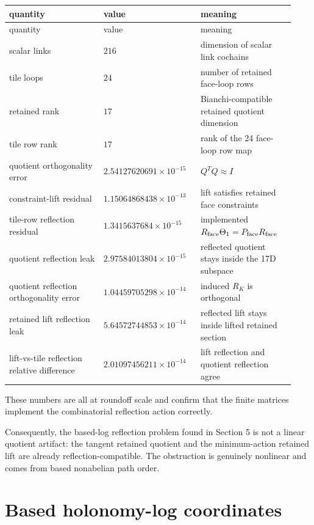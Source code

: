 \documentclass[10pt]{article}
\begin{document}
\begin{center}
\small
\begin{longtable}{|p{0.31\linewidth}|p{0.31\linewidth}|p{0.31\linewidth}|}
\hline
quantity & value & meaning \\
\hline
\endfirsthead
\hline
quantity & value & meaning \\
\hline
\endhead
scalar links & \(216\) & dimension of scalar link cochains \\
\hline
tile loops & \(24\) & number of retained face-loop rows \\
\hline
retained rank & \(17\) & Bianchi-compatible retained quotient dimension \\
\hline
tile row rank & \(17\) & rank of the 24 face-loop row map \\
\hline
quotient orthogonality error & \(2.54127620691\times10^{-15}\) & \(Q^TQ\approx I\) \\
\hline
constraint-lift residual & \(1.15064868438\times10^{-13}\) & lift satisfies retained face constraints \\
\hline
tile-row reflection residual & \(1.3415637684\times10^{-15}\) & implemented \(R_{\rm face}\Theta_1=P_{\rm face}R_{\rm face}\) \\
\hline
quotient reflection leak & \(2.97584013804\times10^{-15}\) & reflected quotient stays inside the 17D subspace \\
\hline
quotient reflection orthogonality error & \(1.04459705298\times10^{-14}\) & induced \(R_K\) is orthogonal \\
\hline
retained lift reflection leak & \(5.64572744853\times10^{-14}\) & reflected lift stays inside lifted retained section \\
\hline
lift-vs-tile reflection relative difference & \(2.01097456211\times10^{-14}\) & lift reflection and quotient reflection agree \\
\hline
\end{longtable}
\end{center}

These numbers are all at roundoff scale and confirm that the finite matrices implement the combinatorial reflection action correctly.

Consequently, the based-log reflection problem found in Section 5 is not a linear quotient artifact: the tangent retained quotient and the minimum-action retained lift are already reflection-compatible.  The obstruction is genuinely nonlinear and comes from based nonabelian path order.

\section{Based holonomy-log coordinates}
\end{document}
